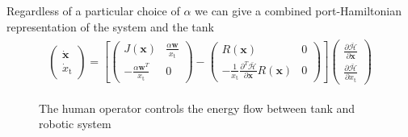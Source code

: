 \documentclass[a4paper,twoside, openright,12pt]{report}
\newcommand{\f}[1]{\boldsymbol{#1}}
\newcommand{\g}[1]{\text{#1}}
\begin{document}
Regardless of a particular choice of $\alpha$ we can give a combined port-Hamiltonian representation of the  system and the tank
\begin{eqnarray}
\begin{aligned}
\begin{pmatrix}
\dot{\f{x}} \\ \dot{x}_\g{t}
\end{pmatrix} =
\left[
\begin{pmatrix}
J(\f{x}) & \frac{\alpha \f{w}}{x_\g{t}} \\ -\frac{\alpha \f{w}^T}{x_\g{t}} & 0
\end{pmatrix} - 
\begin{pmatrix}
R(\f{x}) & 0 \\ -\frac{1}{x_\g{t}}\frac{\partial^T \bar{\mathcal{H}}}{\partial \f{x}}R(\f{x}) & 0
\end{pmatrix}
\right]
\begin{pmatrix}
\frac{\partial \bar{\mathcal{H}}}{\partial \f{x}} \\
\frac{\partial \bar{\mathcal{H}}}{\partial x_\g{t}}
\end{pmatrix}
\end{aligned}
\end{eqnarray}

\begin{figure}[b!]
	\centering
	\small
	\def\svgwidth{0.95\columnwidth}
	
	\vspace{10pt}
	\caption{The human operator controls the energy flow between tank and robotic system}
	\label{FIG:energytank}
\end{figure} 
\end{document}
